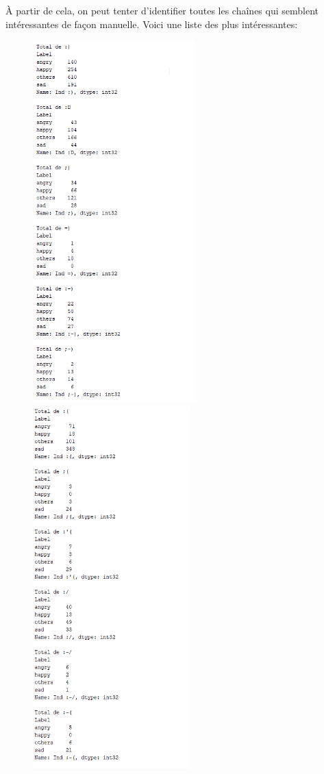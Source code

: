 À partir de cela, on peut tenter d'identifier toutes les chaînes qui semblent intéressantes de façon manuelle. Voici une liste des plus intéressantes: 

\begin{figure}[h!] %
	\begin{minipage}[b]{0.3\textwidth}
		\includegraphics[width=\textwidth,height=14cm]{images/analyse_emojis_car_pos}
	\end{minipage}
	\hfill
	\begin{minipage}[b]{0.3\textwidth}
		\includegraphics[width=\textwidth,height=14cm]{images/analyse_emojis_car_neg}

\end{minipage}
\end{figure}
